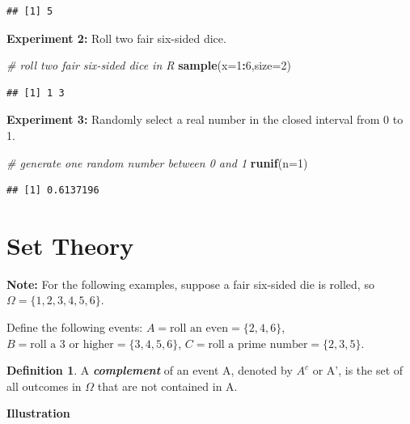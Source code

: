 \documentclass[
  11pt,
  oneside]{book}
\newenvironment{Shaded}{\begin{snugshade}}{\end{snugshade}}
\newcommand{\AttributeTok}[1]{\textcolor[rgb]{0.13,0.29,0.53}{#1}}
\newcommand{\CommentTok}[1]{\textcolor[rgb]{0.56,0.35,0.01}{\textit{#1}}}
\newcommand{\DecValTok}[1]{\textcolor[rgb]{0.00,0.00,0.81}{#1}}
\newcommand{\FunctionTok}[1]{\textcolor[rgb]{0.13,0.29,0.53}{\textbf{#1}}}
\newcommand{\NormalTok}[1]{#1}
\newcommand{\SpecialCharTok}[1]{\textcolor[rgb]{0.81,0.36,0.00}{\textbf{#1}}}
\theoremstyle{definition}
\newtheorem{definition}{Definition}[chapter]
\theoremstyle{definition}
\theoremstyle{definition}
\theoremstyle{definition}
\theoremstyle{remark}
\begin{document}
\begin{verbatim}
## [1] 5
\end{verbatim}

\textbf{Experiment 2:} Roll two fair six-sided dice.

\begin{Shaded}
\begin{Highlighting}[]
\CommentTok{\# roll two fair six{-}sided dice in R}
\FunctionTok{sample}\NormalTok{(}\AttributeTok{x=}\DecValTok{1}\SpecialCharTok{:}\DecValTok{6}\NormalTok{,}\AttributeTok{size=}\DecValTok{2}\NormalTok{)}
\end{Highlighting}
\end{Shaded}

\begin{verbatim}
## [1] 1 3
\end{verbatim}

\textbf{Experiment 3:} Randomly select a real number in the closed interval from 0 to 1.

\begin{Shaded}
\begin{Highlighting}[]
\CommentTok{\# generate one random number between 0 and 1}
\FunctionTok{runif}\NormalTok{(}\AttributeTok{n=}\DecValTok{1}\NormalTok{)}
\end{Highlighting}
\end{Shaded}

\begin{verbatim}
## [1] 0.6137196
\end{verbatim}

\newpage

\section{Set Theory}\label{set-theory}

\textbf{Note:} For the following examples, suppose a fair six-sided die is rolled, so \(\Omega=\{1,2,3,4,5,6\}\).

Define the following events: \(A = \text{roll an even} = \{2,4,6\}\), \(B=\text{roll a 3 or higher} =\{3,4,5,6\}\), \(C=\text{roll a prime number}=\{2,3,5\}\).

\begin{definition}
A \textbf{\emph{complement}} of an event A, denoted by \(A^c\) or A', is the set of all outcomes in \(\Omega\) that are not contained in A.
\end{definition}

\textbf{Illustration}
\end{document}
